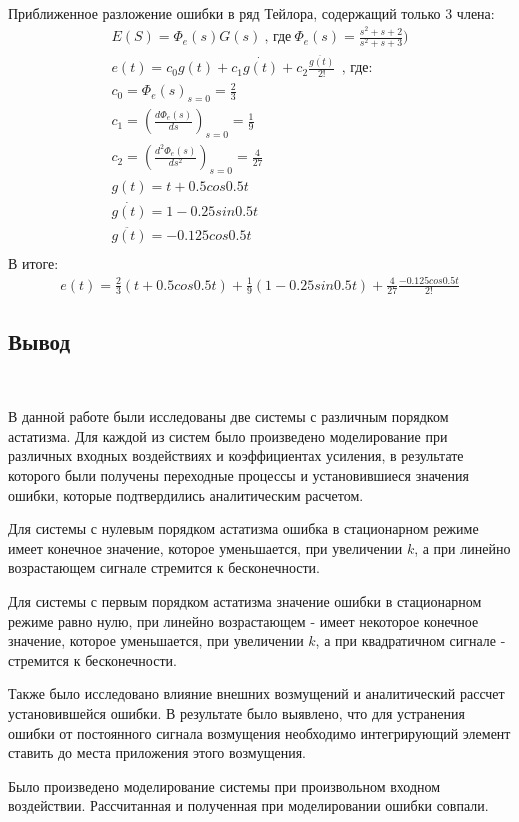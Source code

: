 \documentclass[a4paper,12pt]{article}
\begin{document}
	\paragraph {} Приближенное разложение ошибки в ряд Тейлора, содержащий только 3 члена:\\
	\begin{gather}
	E(S)=\Phi_e(s)G(s) ~\text{,~где}~ \displaystyle \Phi_e(s)=\frac{s^2+s+2}{s^2+s+3})\\
	e(t)=c_0g(t)+c_1\dot{g(t)}+c_2\frac{\ddot{g(t)}}{2!}~~\text{, где:}\\
	c_0=\Phi_e(s)_{s=0}=\frac{2}{3}\\
	c_1=(\frac{d\Phi_e(s)}{ds})_{s=0}=\frac{1}{9}\\
	c_2=(\frac{d^2\Phi_e(s)}{ds^2})_{s=0}=\frac{4}{27}\\
	g(t)=t+0.5cos{0.5t}\\
	\dot{g(t)}=1-0.25sin{0.5t}\\
	\ddot{g(t)}=-0.125cos{0.5t}\\
	\end{gather}
	В итоге:
	\begin{gather}
	e(t)=\frac{2}{3}(t+0.5cos{0.5t})+\frac{1}{9}(1-0.25sin{0.5t})+\frac{4}{27}\frac{-0.125cos{0.5t}}{2!}
	\end{gather}
	\newpage
	\begin{center}
		\section*{Вывод}  ~~\\
	\end{center}
	\par
	В данной работе были исследованы две системы с различным порядком астатизма. Для каждой из систем было произведено моделирование при различных входных воздействиях и коэффициентах усиления, в результате которого были получены переходные процессы и установившиеся значения ошибки, которые подтвердились аналитическим расчетом.
	\par Для системы с нулевым порядком астатизма ошибка в стационарном режиме имеет конечное значение, которое уменьшается, при увеличении $k$, а при линейно возрастающем сигнале стремится к бесконечности.
	\par Для системы с первым порядком астатизма значение ошибки в стационарном режиме равно нулю, при линейно возрастающем - имеет некоторое конечное значение, которое уменьшается, при увеличении $k$, а при квадратичном сигнале - стремится к бесконечности.    
	\par Также было исследовано влияние внешних возмущений и аналитический рассчет установившейся ошибки. В результате было выявлено, что для устранения ошибки от постоянного сигнала возмущения необходимо интегрирующий элемент ставить до места приложения этого возмущения.
	\par Было произведено моделирование системы при произвольном входном воздействии. Рассчитанная и полученная при моделировании ошибки совпали. 
	
\end{document}
